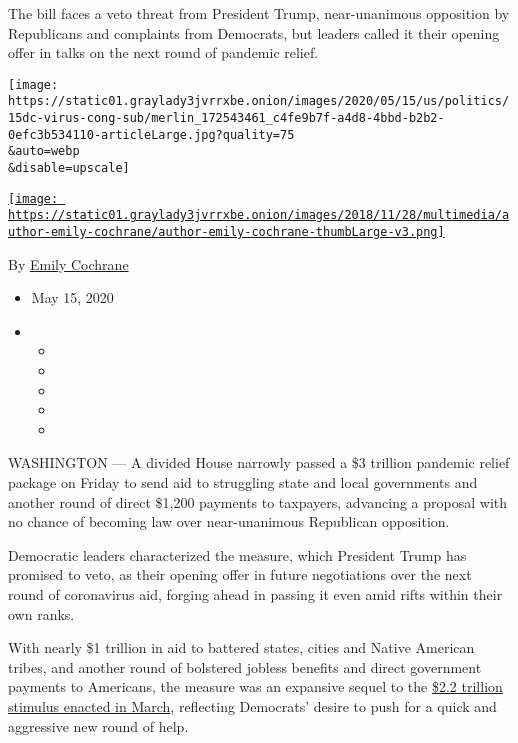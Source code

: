 The bill faces a veto threat from President Trump, near-unanimous
opposition by Republicans and complaints from Democrats, but leaders
called it their opening offer in talks on the next round of pandemic
relief.

\texttt{[image: https://static01.graylady3jvrrxbe.onion/images/2020/05/15/us/politics/15dc-virus-cong-sub/merlin\_172543461\_c4fe9b7f-a4d8-4bbd-b2b2-0efc3b534110-articleLarge.jpg?quality=75\\\&auto=webp\\\&disable=upscale]}

\href{https://www.nytimes3xbfgragh.onion/by/emily-cochrane}{\texttt{[image: https://static01.graylady3jvrrxbe.onion/images/2018/11/28/multimedia/author-emily-cochrane/author-emily-cochrane-thumbLarge-v3.png]}}

By \href{https://www.nytimes3xbfgragh.onion/by/emily-cochrane}{Emily
Cochrane}

\begin{itemize}
\item
  May 15, 2020
\item
  \begin{itemize}
  \item
  \item
  \item
  \item
  \item
  \end{itemize}
\end{itemize}

WASHINGTON --- A divided House narrowly passed a \$3 trillion pandemic
relief package on Friday to send aid to struggling state and local
governments and another round of direct \$1,200 payments to taxpayers,
advancing a proposal with no chance of becoming law over near-unanimous
Republican opposition.

Democratic leaders characterized the measure, which President Trump has
promised to veto, as their opening offer in future negotiations over the
next round of coronavirus aid, forging ahead in passing it even amid
rifts within their own ranks.

With nearly \$1 trillion in aid to battered states, cities and Native
American tribes, and another round of bolstered jobless benefits and
direct government payments to Americans, the measure was an expansive
sequel to the
\href{https://www.nytimes3xbfgragh.onion/2020/03/25/us/politics/coronavirus-senate-deal.html}{\$2.2
trillion stimulus enacted in March}, reflecting Democrats' desire to
push for a quick and aggressive new round of help.

